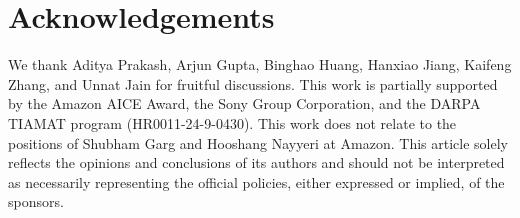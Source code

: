 \section{Acknowledgements}
We thank Aditya Prakash, Arjun Gupta, Binghao Huang, Hanxiao Jiang, Kaifeng Zhang, and Unnat Jain for fruitful discussions. This work is partially supported by the Amazon AICE Award, the Sony Group Corporation, and the DARPA TIAMAT program (HR0011-24-9-0430). This work does not relate to the positions of Shubham Garg and Hooshang Nayyeri at Amazon. This article solely reflects the opinions and conclusions of its authors and should not be interpreted as necessarily representing the official policies, either expressed or implied, of the sponsors.
